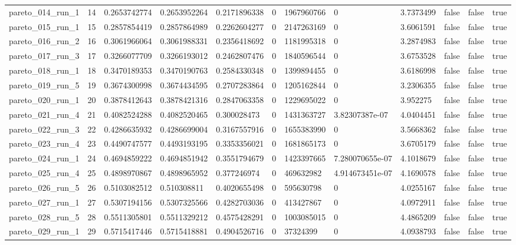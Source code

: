\begin{tabular}{@{}llllllllllll@{}}
pareto\_014\_run\_1 & 14 & 0.2653742774 & 0.2653952264 & 0.2171896338 & 0 & 1967960766 & 0 & 3.7373499 & false & false & true \\
pareto\_015\_run\_1 & 15 & 0.2857854419 & 0.2857864989 & 0.2262604277 & 0 & 2147263169 & 0 & 3.6061591 & false & false & true \\
pareto\_016\_run\_2 & 16 & 0.3061966064 & 0.3061988331 & 0.2356418692 & 0 & 1181995318 & 0 & 3.2874983 & false & false & true \\
pareto\_017\_run\_3 & 17 & 0.3266077709 & 0.3266193012 & 0.2462807476 & 0 & 1840596544 & 0 & 3.6753528 & false & false & true \\
pareto\_018\_run\_1 & 18 & 0.3470189353 & 0.3470190763 & 0.2584330348 & 0 & 1399894455 & 0 & 3.6186998 & false & false & true \\
pareto\_019\_run\_5 & 19 & 0.3674300998 & 0.3674434595 & 0.2707283864 & 0 & 1205162844 & 0 & 3.2306355 & false & false & true \\
pareto\_020\_run\_1 & 20 & 0.3878412643 & 0.3878421316 & 0.2847063358 & 0 & 1229695022 & 0 & 3.952275 & false & false & true \\
pareto\_021\_run\_4 & 21 & 0.4082524288 & 0.4082520465 & 0.300028473 & 0 & 1431363727 & 3.82307387e-07 & 4.0404451 & false & false & true \\
pareto\_022\_run\_3 & 22 & 0.4286635932 & 0.4286699004 & 0.3167557916 & 0 & 1655383990 & 0 & 3.5668362 & false & false & true \\
pareto\_023\_run\_4 & 23 & 0.4490747577 & 0.4493193195 & 0.3353356021 & 0 & 1681865173 & 0 & 3.6705179 & false & false & true \\
pareto\_024\_run\_1 & 24 & 0.4694859222 & 0.4694851942 & 0.3551794679 & 0 & 1423397665 & 7.280070655e-07 & 4.1018679 & false & false & true \\
pareto\_025\_run\_4 & 25 & 0.4898970867 & 0.4898965952 & 0.377246974 & 0 & 469632982 & 4.914673451e-07 & 4.1690578 & false & false & true \\
pareto\_026\_run\_5 & 26 & 0.5103082512 & 0.510308811 & 0.4020655498 & 0 & 595630798 & 0 & 4.0255167 & false & false & true \\
pareto\_027\_run\_1 & 27 & 0.5307194156 & 0.5307325566 & 0.4282703036 & 0 & 413427867 & 0 & 4.0972911 & false & false & true \\
pareto\_028\_run\_5 & 28 & 0.5511305801 & 0.5511329212 & 0.4575428291 & 0 & 1003085015 & 0 & 4.4865209 & false & false & true \\
pareto\_029\_run\_1 & 29 & 0.5715417446 & 0.5715418881 & 0.4904526716 & 0 & 37324399 & 0 & 4.0938793 & false & false & true \\

\end{tabular}
